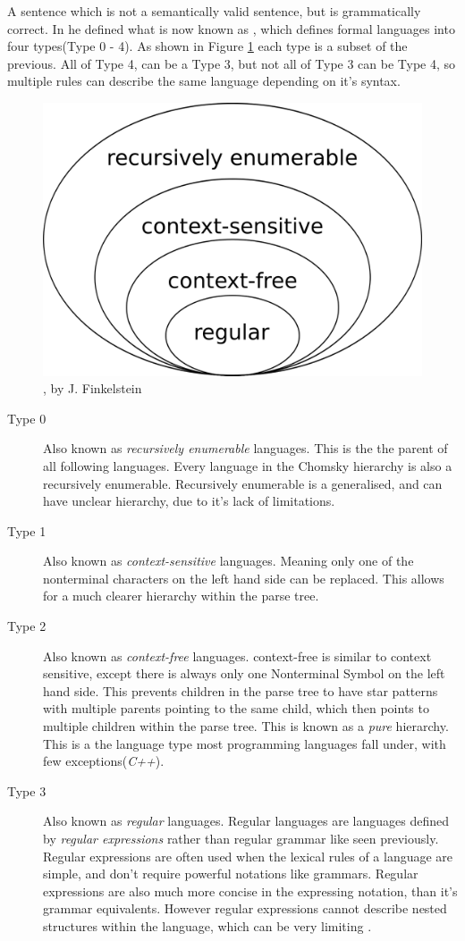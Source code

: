 A sentence which is not a semantically valid sentence, but is grammatically correct. In \autocite{Chomsky} he defined what is now known as \emph{\hierarchy{}}, which defines formal languages into four types(Type 0 - 4). As shown in Figure \ref{fig:Chomsky} each type is a subset of the previous. All of Type 4, can be a Type 3, but not all of Type 3 can be Type 4, so multiple rules can describe the same language depending on it's syntax.
\clearpage
\begin{figure}[h]
    \centerline{\includegraphics[width=0.5\linewidth]{img/Chomsky.png}}
    \caption{\hierarchy{}, by J. Finkelstein}
    \label{fig:Chomsky}
\end{figure}
\begin{description}
    \item[Type 0] Also known as \emph{recursively enumerable} languages. This is the the parent of all following languages. Every language in the Chomsky hierarchy is also a recursively enumerable. Recursively enumerable is a generalised, and can have unclear hierarchy, due to it's lack of limitations.
    \item[Type 1] Also known as \emph{context-sensitive} languages. Meaning only one of the nonterminal characters on the left hand side can be replaced. This allows for a much clearer hierarchy within the parse tree.
    \item[Type 2] Also known as \emph{context-free} languages. context-free is similar to context sensitive, except there is always only one Nonterminal Symbol on the left hand side. This prevents children in the parse tree to have star patterns with multiple parents pointing to the same child, which then points to multiple children within the parse tree. This is known as a \emph{pure} hierarchy. This is a the language type most programming languages fall under, with few exceptions(\emph{C++}).
    \item[Type 3]  Also known as \emph{regular} languages. Regular languages are languages defined by \emph{regular expressions} rather than regular grammar like seen previously. Regular expressions are often used when the lexical rules of a language are simple, and don't require powerful notations like grammars. Regular expressions are also much more concise in the expressing notation, than it's grammar equivalents. However regular expressions cannot describe nested structures within the language, which can be very limiting \autocite{DragonBook}.
\end{description}

